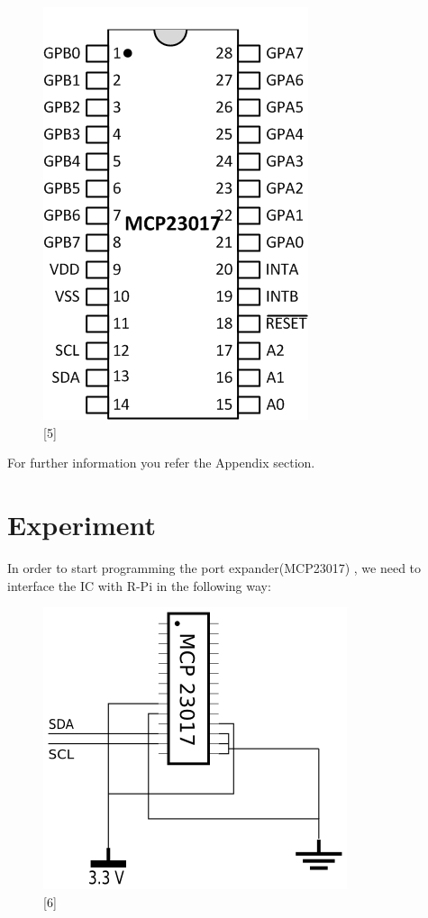 \documentclass[11pt,a4paper]{article}
\begin{document}
	\begin{figure}[h!]
		\includegraphics[scale=0.7]{mcp23017.png}
		\centering
		\caption{[5]}
	\end{figure}
	
	\flushleft
	For further information you refer the Appendix section.
	
	\section{Experiment}
	In order to start programming the port expander(MCP23017) , we need to interface the IC with R-Pi in the following way:
	\begin{figure}[h!]
		\includegraphics[scale=0.8]{interface.png}
		\centering
		\caption{[6]}
	\end{figure} 
	\flushleft
	
\end{document}
